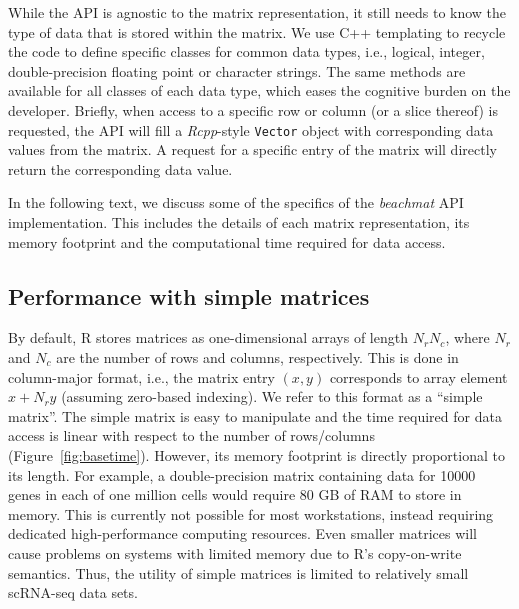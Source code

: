 \documentclass[10pt,letterpaper]{article}
\newcommand{\beachmat}{\textit{beachmat}}
\newcommand{\code}[1]{\texttt{#1}}
\begin{document}
While the API is agnostic to the matrix representation, it still needs to know the type of data that is stored within the matrix.
We use C++ templating to recycle the code to define specific classes for common data types, i.e., logical, integer, double-precision floating point or character strings.
The same methods are available for all classes of each data type, which eases the cognitive burden on the developer.
Briefly, when access to a specific row or column (or a slice thereof) is requested, the API will fill a \textit{Rcpp}-style \code{Vector} object with corresponding data values from the matrix.
A request for a specific entry of the matrix will directly return the corresponding data value.

In the following text, we discuss some of the specifics of the \beachmat{} API implementation.
This includes the details of each matrix representation, its memory footprint and the computational time required for data access.

\subsection*{Performance with simple matrices}
By default, R stores matrices as one-dimensional arrays of length $N_rN_c$, where $N_r$ and $N_c$ are the number of rows and columns, respectively.
This is done in column-major format, i.e., the matrix entry $(x, y)$ corresponds to array element $x + N_ry$ (assuming zero-based indexing).
We refer to this format as a ``simple matrix''.
The simple matrix is easy to manipulate and the time required for data access is linear with respect to the number of rows/columns (Figure~\ref{fig:basetime}).
However, its memory footprint is directly proportional to its length.
For example, a double-precision matrix containing data for 10000 genes in each of one million cells would require 80 GB of RAM to store in memory.
This is currently not possible for most workstations, instead requiring dedicated high-performance computing resources.
Even smaller matrices will cause problems on systems with limited memory due to R's copy-on-write semantics.
Thus, the utility of simple matrices is limited to relatively small scRNA-seq data sets.

\end{document}

